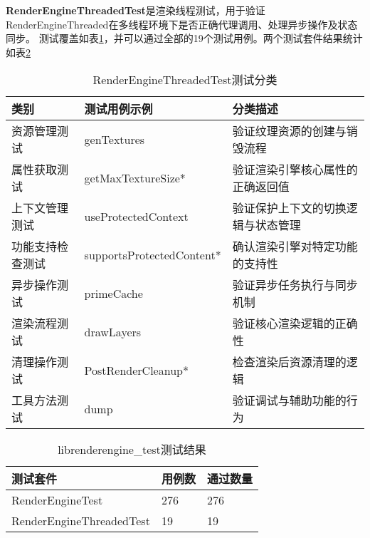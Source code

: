 \textbf{RenderEngineThreadedTest}是渲染线程测试，用于验证RenderEngineThreaded在多线程环境下是否正确代理调用、处理异步操作及状态同步。
测试覆盖如表\ref{tab:RenderEngineThreadedTest测试分类}，并可以通过全部的19个测试用例。两个测试套件结果统计如表\ref{tab:librenderengine_test测试结果}

\begin{table}[H]
    \centering
    \caption{RenderEngineThreadedTest测试分类}
    \label{tab:RenderEngineThreadedTest测试分类}
    \begin{tabular}{lll}
      \toprule
      类别 & 测试用例示例 & 分类描述 \\
      \midrule
      资源管理测试 & genTextures & 验证纹理资源的创建与销毁流程 \\
      属性获取测试 & getMaxTextureSize* & 验证渲染引擎核心属性的正确返回值 \\
      上下文管理测试 & useProtectedContext & 验证保护上下文的切换逻辑与状态管理 \\
      功能支持检查测试 & supportsProtectedContent* & 确认渲染引擎对特定功能的支持性 \\
      异步操作测试 & primeCache & 验证异步任务执行与同步机制 \\
      渲染流程测试 & drawLayers & 验证核心渲染逻辑的正确性 \\
      清理操作测试 & PostRenderCleanup* & 检查渲染后资源清理的逻辑 \\
      工具方法测试 & dump & 验证调试与辅助功能的行为 \\
      \bottomrule
    \end{tabular}
    \note{}
\end{table}

\begin{table}[H]
    \centering
    \caption{librenderengine\_test测试结果}
    \label{tab:librenderengine_test测试结果}
    \begin{tabular}{lll}
      \toprule
      测试套件 & 用例数 & 通过数量 \\
      \midrule
      RenderEngineTest & 276 & 276 \\
      RenderEngineThreadedTest & 19 & 19 \\
      \bottomrule
    \end{tabular}
    \note{}
\end{table}

